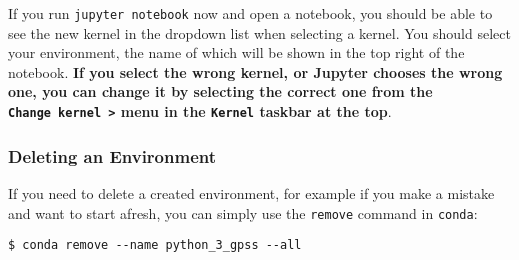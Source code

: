 \documentclass[11pt]{article}
\begin{document}
If you run \texttt{jupyter\ notebook} now and open a notebook, you
should be able to see the new kernel in the dropdown list when selecting
a kernel. You should select your environment, the name of which will be
shown in the top right of the notebook. \textbf{If you select the wrong
kernel, or Jupyter chooses the wrong one, you can change it by selecting
the correct one from the \texttt{Change\ kernel\ \textgreater{}} menu in
the \texttt{Kernel} taskbar at the top}.

\hypertarget{deleting-an-environment}{%
\subsubsection{Deleting an Environment}\label{deleting-an-environment}}

If you need to delete a created environment, for example if you make a
mistake and want to start afresh, you can simply use the \texttt{remove}
command in \texttt{conda}:

\begin{verbatim}
$ conda remove --name python_3_gpss --all
\end{verbatim}


    
    
    
    
\end{document}
